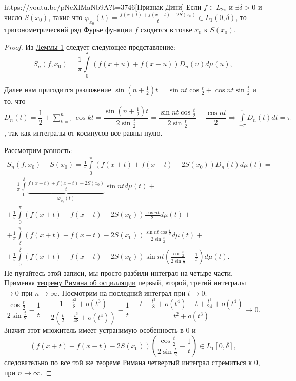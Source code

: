 \begin{linkthm}{https://youtu.be/pNeXlMaNb9A?t=3746}[Признак Дини]
	Если $f\in L_{2\pi}$ и $\exists\delta>0$ и число $S(x_0)$, такие что $\varphi_{x_0}(t)=\frac{f(x+t)+f(x-t)-2S(x_0)}{t}\in L_1(0,\delta)$, то тригонометрический ряд Фурье функции $f$ сходится в точке $x_0$ к $S(x_0)$.
\end{linkthm} 
\begin{proof}
	Из \hyperref[lemma_12.2.1]{Леммы 1} следует следующее представление: $$S_n(f,x_0)=\frac{1}{\pi}\int\limits_{0}^\pi(f(x+u)+f(x-u))D_n(u)d\mu(u),$$
	
	Далее нам пригодится разложение $\sin(n+\frac{1}{2})t=\sin nt\cos \frac{t}{2}+\cos nt\sin\frac{t}{2}$ и то, что\\ $D_n(t)=\dfrac{1}{2}+\sum\limits_{k=1}^n\cos kt=\dfrac{\sin(n+\frac{1}{2})t}{2\sin\frac{t}{2}}=\dfrac{\sin nt\cos \frac{t}{2}}{2\sin\frac{t}{2}}+\dfrac{\cos nt}{2}\Rightarrow \int\limits_{-\pi}^\pi D_n(t)dt=\pi$, так как интегралы от косинусов все равны нулю.
	
	Рассмотрим разность:
	\begin{multline*}
		S_n(f,x_0)-S(x_0)=\frac{1}{\pi}\int\limits_{0}^\pi(f(x+t)+f(x-t)-2S(x_0))D_n(t)d\mu(t)=\\=\frac{1}{\pi}\int\limits_{0}^\delta\underbrace{\frac{f(x+t)+f(x-t)-2S(x_0)}{t}}_{\varphi_{x_0}(t)}\sin ntd\mu(t)+\\+\frac{1}{\pi}\int\limits_{0}^\pi (f(x+t)+f(x-t)-2S(x_0))\frac{\cos nt}{2}d\mu(t)+ \\ +\frac{1}{\pi}\int\limits_{\delta}^\pi (f(x+t)+f(x-t)-2S(x_0))\frac{\sin nt\cos\frac{t}{2}}{2\sin\frac{t}{2}}d\mu(t)+\\+\frac{1}{\pi}\int\limits_{0}^\delta (f(x+t)+f(x-t)-2S(x_0))\sin nt \left(\frac{\cos \frac{t}{2}}{2\sin\frac{t}{2}}-\frac{1}{t}\right)d\mu(t).
	\end{multline*}
Не пугайтесь этой записи, мы просто разбили интеграл на четыре части. Применяя \hyperref[theorem_12.1.1]{теорему Римана об осцилляции} первый, второй, третий интегралы $\to 0$ при $n\to\infty$. Посмотрим на последний интеграл при $t\to 0$:
$$\frac{\cos \frac{t}{2}}{2\sin\frac{t}{2}}-\frac{1}{t}=\frac{1-\frac{t^2}{8}+o(t^3)}{2(\frac{t}{2}-\frac{t^3}{48}+o(t^4))}-\frac{1}{t}=\frac{t-\frac{t^3}{8}+o(t^4)-t+\frac{t^3}{24}+o(t^4)}{t^2+o(t^3)}\to 0.$$
 Значит этот множитель имеет устранимую особенность в 0 и $$(f(x+t)+f(x-t)-2S(x_0))\left(\frac{\cos \frac{t}{2}}{2\sin\frac{t}{2}}-\frac{1}{t}\right)\in L_1[0,\delta], $$ следовательно по все той же теореме Римана четвертый интеграл стремиться к 0, при $n\to\infty$.
\end{proof}














